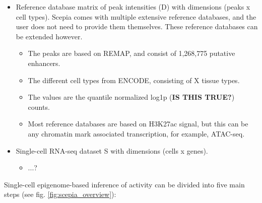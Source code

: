 \begin{itemize}
	\item Reference database matrix of peak intensities (D) with dimensions (peaks x cell types). Scepia comes with multiple extensive reference databases, and the user does not need to provide them themselves. These reference databases can be extended however.
    \begin{itemize}
    \item The peaks are based on REMAP, and consist of 1,268,775 putative enhancers.
    \item The different cell types from ENCODE, consisting of X tissue types.
    \item The values are the quantile normalized log1p (\textbf{IS THIS TRUE?}) counts.
    \item Most reference databases are based on H3K27ac signal, but this can be any chromatin mark associated transcription, for example, ATAC-seq.
    \end{itemize}
	\item Single-cell RNA-seq dataset S with dimensions (cells x genes). 
    \begin{itemize}
        \item ...?
    \end{itemize}
\end{itemize}

\noindent
Single-cell epigenome-based inference of activity can be divided into five main steps (see fig. \ref{fig:scepia_overview}):

